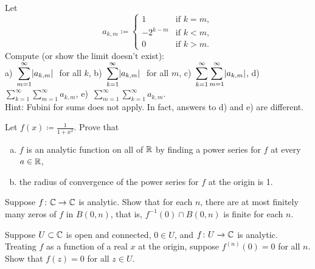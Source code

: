 \begin{exercise}
Let
\begin{equation*}
a_{k,m} \coloneqq
\begin{cases}
1        & \text{if } k=m,\\
-2^{k-m} & \text{if } k<m,\\
0        & \text{if } k>m.
\end{cases}
\end{equation*}
Compute (or show the limit doesn't exist):
\\
a)~$\displaystyle \sum_{m=1}^\infty \lvert {a_{k,m}} \rvert~$ for all $k$,
\hspace{\fill}
b)~$\displaystyle \sum_{k=1}^\infty \lvert {a_{k,m}} \rvert~$ for all $m$,
\hspace{\fill}
c)~$\displaystyle \sum_{k=1}^\infty \sum_{m=1}^\infty \lvert {a_{k,m}} \rvert$,
\hspace{\fill}
d)~$\displaystyle \sum_{k=1}^\infty \sum_{m=1}^\infty a_{k,m}$,
\hspace{\fill}
e)~$\displaystyle \sum_{m=1}^\infty \sum_{k=1}^\infty a_{k,m}$.
\\
Hint: Fubini for sums does not apply.
In fact, answers to d) and e) are different.
\end{exercise}

\begin{exercise}
\pagebreak[2]
Let $f(x) \coloneqq \frac{1}{1+x^2}$.  Prove that
\begin{enumerate}[a)]
\item
$f$ is an analytic function on all of ${\mathbb{R}}$
by finding a power series for $f$ at every $a \in {\mathbb{R}}$,
\item
the radius of convergence of
the power series for $f$ at the origin is 1.
\end{enumerate}
\end{exercise}


\begin{exercise}
\pagebreak[2]
Suppose $f \colon {\mathbb{C}} \to {\mathbb{C}}$ is analytic.  Show that for each
$n$, there are at most finitely many zeros of $f$ in $B(0,n)$, that is,
$f^{-1}(0) \cap B(0,n)$ is finite for each $n$.
\end{exercise}

\begin{exercise}
Suppose $U \subset {\mathbb{C}}$ is open and connected, $0 \in U$, and $f \colon U
\to {\mathbb{C}}$ is analytic.  Treating $f$ as a function of a real $x$
at the origin, suppose $f^{(n)}(0) = 0$ for all $n$.  Show that $f(z) = 0$
for all $z \in U$.
\end{exercise}

